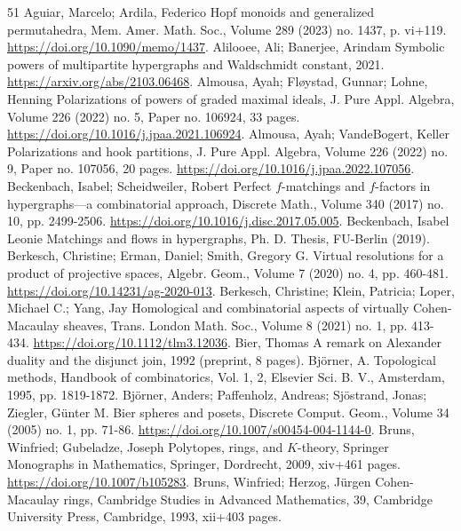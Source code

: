 \documentclass[10pt,a4paper]{article}
\theoremstyle{definition}
\theoremstyle{remark}
\theoremstyle{plain}
\begin{document}
\begin{thebibliography}{51}
 Aguiar, Marcelo; Ardila, Federico Hopf monoids and generalized permutahedra, Mem. Amer. Math. Soc., Volume 289 (2023) no. 1437, p. vi+119. \url{https://doi.org/10.1090/memo/1437}.
 Alilooee, Ali; Banerjee, Arindam Symbolic powers of multipartite hypergraphs and Waldschmidt constant, 2021. \url{https://arxiv.org/abs/2103.06468}.
 Almousa, Ayah; Fløystad, Gunnar; Lohne, Henning Polarizations of powers of graded maximal ideals, J. Pure Appl. Algebra, Volume 226 (2022) no. 5, Paper no. 106924, 33 pages. \url{https://doi.org/10.1016/j.jpaa.2021.106924}.
 Almousa, Ayah; VandeBogert, Keller Polarizations and hook partitions, J. Pure Appl. Algebra, Volume 226 (2022) no. 9, Paper no. 107056, 20 pages. \url{https://doi.org/10.1016/j.jpaa.2022.107056}.
 Beckenbach, Isabel; Scheidweiler, Robert Perfect $f$-matchings and $f$-factors in hypergraphs—a combinatorial approach, Discrete Math., Volume 340 (2017) no. 10, pp. 2499-2506. \url{https://doi.org/10.1016/j.disc.2017.05.005}.
 Beckenbach, Isabel Leonie Matchings and flows in hypergraphs, Ph. D. Thesis, FU-Berlin (2019).
 Berkesch, Christine; Erman, Daniel; Smith, Gregory G. Virtual resolutions for a product of projective spaces, Algebr. Geom., Volume 7 (2020) no. 4, pp. 460-481. \url{https://doi.org/10.14231/ag-2020-013}.
 Berkesch, Christine; Klein, Patricia; Loper, Michael C.; Yang, Jay Homological and combinatorial aspects of virtually Cohen-Macaulay sheaves, Trans. London Math. Soc., Volume 8 (2021) no. 1, pp. 413-434. \url{https://doi.org/10.1112/tlm3.12036}.
 Bier, Thomas A remark on Alexander duality and the disjunct join, 1992 (preprint, 8 pages).
 Björner, A. Topological methods, Handbook of combinatorics, Vol. 1, 2, Elsevier Sci. B. V., Amsterdam, 1995, pp. 1819-1872.
 Björner, Anders; Paffenholz, Andreas; Sjöstrand, Jonas; Ziegler, Günter M. Bier spheres and posets, Discrete Comput. Geom., Volume 34 (2005) no. 1, pp. 71-86. \url{https://doi.org/10.1007/s00454-004-1144-0}.
 Bruns, Winfried; Gubeladze, Joseph Polytopes, rings, and ${K}$-theory, Springer Monographs in Mathematics, Springer, Dordrecht, 2009, xiv+461 pages. \url{https://doi.org/10.1007/b105283}.
 Bruns, Winfried; Herzog, Jürgen Cohen-Macaulay rings, Cambridge Studies in Advanced Mathematics, 39, Cambridge University Press, Cambridge, 1993, xii+403 pages.

\end{thebibliography}
\end{document}
